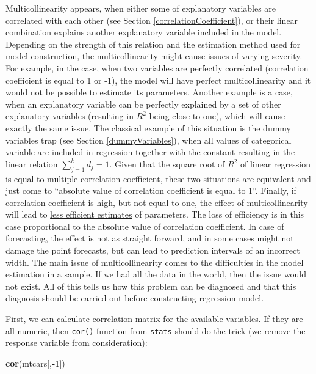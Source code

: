 \documentclass[
]{book}
\newenvironment{Shaded}{\begin{snugshade}}{\end{snugshade}}
\newcommand{\DecValTok}[1]{\textcolor[rgb]{0.00,0.00,0.81}{#1}}
\newcommand{\KeywordTok}[1]{\textcolor[rgb]{0.13,0.29,0.53}{\textbf{#1}}}
\newcommand{\NormalTok}[1]{#1}
\newcommand{\OperatorTok}[1]{\textcolor[rgb]{0.81,0.36,0.00}{\textbf{#1}}}
\theoremstyle{definition}
\theoremstyle{definition}
\theoremstyle{definition}
\theoremstyle{definition}
\theoremstyle{remark}
\begin{document}
Multicollinearity appears, when either some of explanatory variables are correlated with each other (see Section \ref{correlationCoefficient}), or their linear combination explains another explanatory variable included in the model. Depending on the strength of this relation and the estimation method used for model construction, the multicollinearity might cause issues of varying severity. For example, in the case, when two variables are perfectly correlated (correlation coefficient is equal to 1 or -1), the model will have perfect multicollinearity and it would not be possible to estimate its parameters. Another example is a case, when an explanatory variable can be perfectly explained by a set of other explanatory variables (resulting in \(R^2\) being close to one), which will cause exactly the same issue. The classical example of this situation is the dummy variables trap (see Section \ref{dummyVariables}), when all values of categorical variable are included in regression together with the constant resulting in the linear relation \(\sum_{j=1}^k d_j = 1\). Given that the square root of \(R^2\) of linear regression is equal to multiple correlation coefficient, these two situations are equivalent and just come to ``absolute value of correlation coefficient is equal to 1''. Finally, if correlation coefficient is high, but not equal to one, the effect of multicollinearity will lead to \protect\hyperlink{estimatesPropertiesEfficiency}{less efficient estimates} of parameters. The loss of efficiency is in this case proportional to the absolute value of correlation coefficient. In case of forecasting, the effect is not as straight forward, and in some cases might not damage the point forecasts, but can lead to prediction intervals of an incorrect width. The main issue of multicollinearity comes to the difficulties in the model estimation in a sample. If we had all the data in the world, then the issue would not exist. All of this tells us how this problem can be diagnosed and that this diagnosis should be carried out before constructing regression model.

First, we can calculate correlation matrix for the available variables. If they are all numeric, then \texttt{cor()} function from \texttt{stats} should do the trick (we remove the response variable from consideration):

\begin{Shaded}
\begin{Highlighting}[]
\KeywordTok{cor}\NormalTok{(mtcars[,}\OperatorTok{{-}}\DecValTok{1}\NormalTok{])}
\end{Highlighting}
\end{Shaded}
\end{document}
